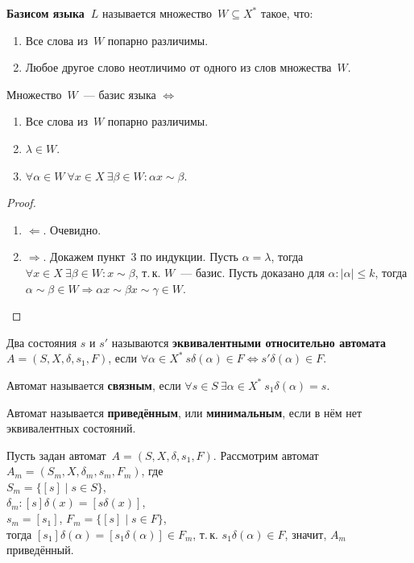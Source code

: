 \textbf{Базисом языка~$L$} называется множество~$W \subseteq X^*$ такое, что:
\begin{enumerate}
	\item Все слова из~$W$ попарно различимы.
	\item Любое другое слово неотличимо от одного из слов множества~$W$.
\end{enumerate}

\begin{theorem}
Множество~$W$~--- базис языка $\Leftrightarrow$
\begin{enumerate}
	\item Все слова из~$W$ попарно различимы.
	\item $\lambda \in W$.
	\item $\forall \alpha \in W \ \forall x \in X \ \exists \beta \in W \colon \alpha x \sim \beta$.
\end{enumerate}
\end{theorem}
\begin{proof}
\begin{enumerate}
	\item $\Leftarrow$. Очевидно.
	\item $\Rightarrow$. Докажем пункт~3 по индукции.
		\indbase Пусть $\alpha = \lambda$, тогда $\forall x \in X \ \exists \beta \in W \colon x \sim \beta$, т.\,к. $W$~--- базис.
		\indstep Пусть доказано для $\alpha \colon |\alpha| \leqslant k$, тогда $\alpha \sim \beta \in W \Rightarrow \alpha x \sim \beta x \sim \gamma \in W$.
		\indend
\end{enumerate}
\end{proof}

Два состояния $s$ и $s'$ называются \textbf{эквивалентными относительно автомата~$A = (S, X, \delta, s_1, F)$}, если $\forall \alpha \in X^* \ \allowbreak s \delta(\alpha) \in F \Leftrightarrow s' \delta(\alpha) \in F$.

 Автомат называется \textbf{связным}, если $\forall s \in S \ \exists \alpha \in X^* \ s_1 \delta(\alpha) = s$.

  Автомат называется \textbf{приведённым}, или \textbf{минимальным}, если в нём нет эквивалентных состояний.

Пусть задан автомат~$A = (S, X, \delta, s_1, F)$.
Рассмотрим автомат~$A_m = (S_m, X, \delta_m, s_m, F_m)$, где\\
$S_m = \{ [s] \mid s \in S \}$,\\
$\delta_m \colon [s] \delta(x) = [s \delta(x)]$,\\
$s_m = [s_1]$, $F_m = \{ [s] \mid s \in F \}$,\\
тогда $[s_1] \delta(\alpha) = [s_1 \delta(\alpha)] \in F_m$, т.\,к. $s_1 \delta(\alpha) \in F$, значит, $A_m$ приведённый.

